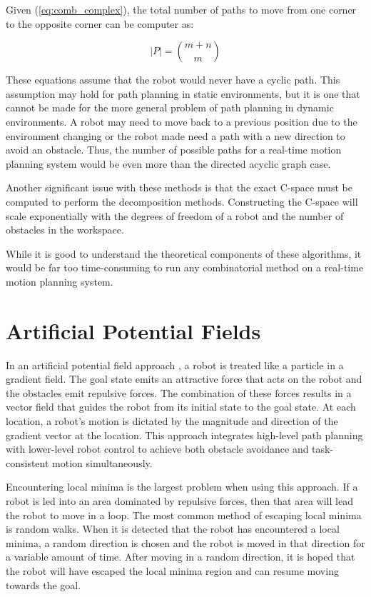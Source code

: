 \documentclass[10pt,conference]{ieeeconf}
\begin{document}
Given (\ref{eq:comb_complex}), the total number of paths to move from one corner to the opposite corner can be computer as:

\begin{equation}
|P| = {m+n \choose m}
\end{equation}

These equations assume that the robot would never have a cyclic path. This assumption may hold for path planning in static environments, but it is one that cannot be made for the more general problem of path planning in dynamic environments. A robot may need to move back to a previous position due to the environment changing or the robot made need a path with a new direction to avoid an obstacle. Thus, the number of possible paths for a real-time motion planning system would be even more than the directed acyclic graph case. 


Another significant issue with these methods is that the exact C-space must be computed to perform the decomposition methods. Constructing the C-space will scale exponentially with the degrees of freedom of a robot and the number of obstacles in the workspace.


While it is good to understand the theoretical components of these algorithms, it would be far too time-consuming to run any combinatorial method on a real-time motion planning system. 




\section{Artificial Potential Fields}

In an artificial potential field approach \cite{khatib1986real}, a robot is treated like a particle in a gradient field. The goal state emits an attractive force that acts on the robot and the obstacles emit repulsive forces. The combination of these forces results in a vector field that guides the robot from its initial state to the goal state. At each location, a robot's motion is dictated by the magnitude and direction of the gradient vector at the location. This approach integrates high-level path planning with lower-level robot control to achieve both obstacle avoidance and task-consistent motion simultaneously.

Encountering local minima is the largest problem when using this approach. If a robot is led into an area dominated by repulsive forces, then that area will lead the robot to move in a loop. The most common method of escaping local minima is random walks. When it is detected that the robot has encountered a local minima, a random direction is chosen and the robot is moved in that direction for a variable amount of time. After moving in a random direction, it is hoped that the robot will have escaped the local minima region and can resume moving towards the goal.
\end{document}
